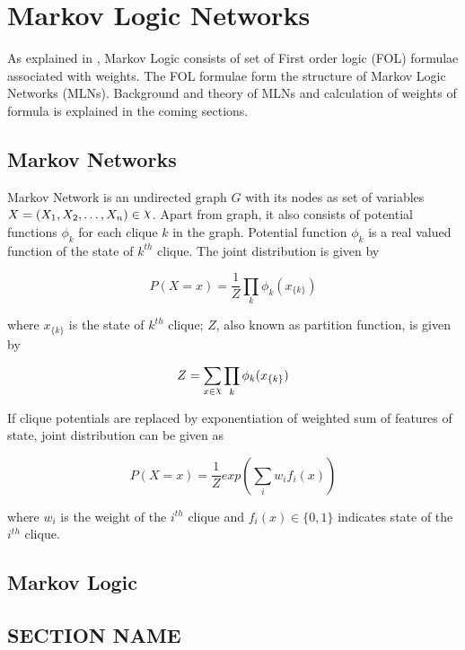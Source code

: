 \chapter{Markov Logic Networks}


As explained in \cite{MarkovLogic}, Markov Logic consists of set of First order
logic (FOL) formulae associated with weights. The FOL formulae form the structure 
of Markov Logic Networks (MLNs). Background and theory of MLNs and calculation of
weights of formula is explained in the coming sections.

\section{Markov Networks}
Markov Network is an undirected graph $G$ with its nodes as set of variables $X = (X_1, X_2,\ldots, X_n) \in \rchi $.
Apart from graph, it also consists of potential functions $\phi_k$ for each clique $k$ in the graph.
Potential function $\phi_k$ is a real valued function of the state of $k^{th}$ clique.
The joint distribution is given by

\begin{equation}
	\label{jointDist}
	P(X = x) = \frac{1}{Z}{\displaystyle \prod_{k} \phi_{k}(x_{\{k\}})}
\end{equation}

where $x_{\{k\}}$ is the state of $k^{th}$ clique;
$Z$, also known as partition function, is given by

\begin{equation}
	\label{partitionFunc}
	Z = \displaystyle \sum_{x \in \rchi} \displaystyle \prod_{k} \phi_k(x_{\{k\}}) 
\end{equation}

If clique potentials are replaced by exponentiation of weighted sum of features of state,
joint distribution can be given as

\begin{equation}
	\label{jointDistWeighted}
	P(X = x) = \frac{1}{Z} exp \left( \displaystyle \sum_i w_i f_i(x) \right)
\end{equation}

where $w_i$ is the weight of the $i^{th}$ clique and $f_i(x) \in \{0,1\}$ indicates state 
of the $i^{th}$ clique.

\section{Markov Logic}

\section{SECTION NAME}
